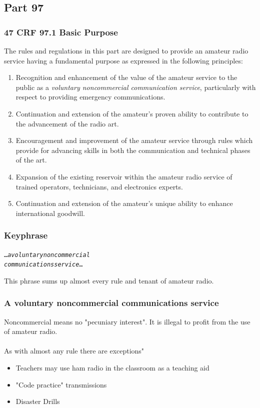 \documentclass[10pt]{beamer}
\begin{document}
\subsection{Part 97}

\begin{frame}
\frametitle{47 CRF 97.1 Basic Purpose}
The rules and regulations in this part are designed to provide an amateur radio service having a fundamental purpose as expressed in the following principles:
\begin{enumerate}[A]
\scriptsize\item  Recognition and enhancement of the value of the amateur service to the public as a \emph{voluntary noncommercial communication service}, particularly with respect to providing emergency communications.\pause
\item Continuation and extension of the amateur's proven ability to contribute to the advancement of the radio art.\pause
\item Encouragement and improvement of the amateur service through rules which provide for advancing skills in both the communication and technical phases of the art.\pause
\item  Expansion of the existing reservoir within the amateur radio service of trained operators, technicians, and electronics experts. \pause
\item Continuation and extension of the amateur's unique ability to enhance international goodwill.
\end{enumerate}
\end{frame}

\begin{frame}
\frametitle{Keyphrase}
\begin{alltt}
\ldots\emph{a voluntary noncommercial\\communications service}\ldots
\end{alltt}
This phrase sums up almost every rule and tenant of amateur radio.
\end{frame}

\begin{frame}
\frametitle{A voluntary noncommercial communications service}
Noncommercial means no "pecuniary interest". It is illegal to profit from the use of amateur radio.\\
\hfil \\As with almost any rule there are exceptions"
\begin{itemize}
\item Teachers may use ham radio in the classroom as a teaching aid
\item "Code practice" transmissions
\item Disaster Drills
\end{itemize}
\end{frame}
\end{document}
